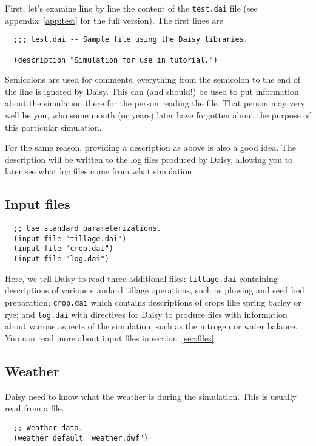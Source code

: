 \documentclass[a4paper]{article}
\begin{document}
First, let's examine line by line the content of the \texttt{test.dai}
file (see appendix~\ref{app:test} for the full version).  The first
lines are

\begin{verbatim}
  ;;; test.dai -- Sample file using the Daisy libraries.

  (description "Simulation for use in tutorial.")
\end{verbatim}

Semicolons are used for comments, everything from the semicolon to the
end of the line is ignored by Daisy.  This can (and should!) be
used to put information about the simulation there for the person
reading the file.  That person may very well be you, who some month
(or years) later have forgotten about the purpose of this particular
simulation.

For the same reason, providing a description as above is also a good
idea.  The description will be written to the log files produced by
Daisy, allowing you to later see what log files come from what
simulation.

\subsection{Input files}
\label{sec:ex-input}

\begin{verbatim}
  ;; Use standard parameterizations.
  (input file "tillage.dai")
  (input file "crop.dai")
  (input file "log.dai")
\end{verbatim}

Here, we tell Daisy to read three additional files:
\texttt{tillage.dai} containing descriptions of various standard
tillage operations, such as plowing and seed bed preparation;
\texttt{crop.dai} which contains descriptions of crops like spring
barley or rye; and \texttt{log.dai} with directives for Daisy to
produce files with information about various aspects of the
simulation, such as the nitrogen or water balance.  You can read more
about input files in section~\ref{sec:files}.

\subsection{Weather}

Daisy need to know what the weather is during the simulation.  This
is usually read from a file.

\begin{verbatim}
  ;; Weather data.
  (weather default "weather.dwf")
\end{verbatim}
\end{document}
